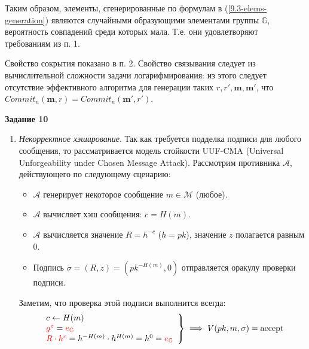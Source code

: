 \documentclass[12pt, a4paper]{extarticle}
\newenvironment*{dummyenv}{}{}
\newcommand{\mysection}[1]{
    \addcontentsline{toc}{section}{#1}
    \begin{dummyenv}
        \bfseries\large #1
    \end{dummyenv}
}
\begin{document}
\begin{enumerate}
        Таким образом, элементы, сгенерированные по формулам в (\ref{9.3-elems-generation}) являются 
        случайными образующими элементами группы $\mathbb{G}$, вероятность совпадений среди которых 
        мала. Т.е. они удовлетворяют требованиям из п. 1.
        
        Свойство сокрытия показано в п. 2. Свойство связывания следует из вычислительной сложности 
        задачи логарифмирования: из этого следует отсутствие эффективного алгоритма для генерации 
        таких $r, r', \mathbf{m}, \mathbf{m'}$, что $Commit_n(\mathbf{m}, r) = 
        Commit_n(\mathbf{m'}, r')$.
\end{enumerate}

\mysection{Задание 10}

\begin{enumerate}
    \item \textit{Некорректное хэширование}. Так как требуется подделка подписи для любого сообщения, 
    	то рассматривается модель стойкости UUF-CMA (Universal Unforgeability under Chosen Message 
    	Attack). Рассмотрим противника $\mathcal{A}$, действующего по следующему сценарию:
        \begin{itemize}
            \item $\mathcal{A}$ генерирует некоторое сообщение $m \in \mathcal{M}$ (любое).
            
            \item $\mathcal{A}$ вычисляет хэш сообщения: $c = H(m)$.
            
            \item $\mathcal{A}$ вычисляется значение $R = h^{-c}$ ($h = pk$), значение $z$ полагается 
            	равным 0.
            
            \item Подпись $\sigma = (R, z) = (pk^{-H(m)}, 0)$ отправляется оракулу проверки подписи.
        \end{itemize}
        
        Заметим, что проверка этой подписи выполнится всегда:
        \begin{equation*}
            \left.\begin{array}{l}
                c \leftarrow H(m) \\
                \textcolor{red}{g^z} = \textcolor{red}{e_{\mathbb{G}}} \\
                \textcolor{red}{R \cdot h^c} = h^{-H(m)} \cdot h^{H(m)} = h^0 = 
                    \textcolor{red}{e_{\mathbb{G}}}
            \end{array}\right\} \implies V(pk, m, \sigma) = \text{accept}
        \end{equation*}
        

\end{enumerate}
\end{document}
